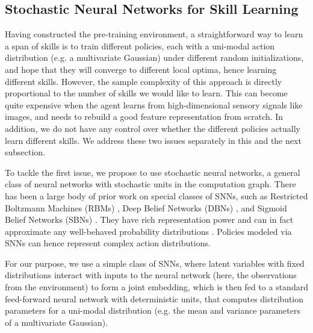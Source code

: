 \documentclass{article} %
\begin{document}
\subsection{Stochastic Neural Networks for Skill Learning}
\label{section:method:snn}

Having constructed the pre-training environment, a straightforward way to learn a span of skills is to train different policies, each with a uni-modal action distribution (e.g. a multivariate Gaussian) under different random initializations, and hope that they will converge to different local optima, hence learning different skills. However, the sample complexity of this approach is directly proportional to the number of skills we would like to learn. This can become quite expensive when the agent learns from high-dimensional sensory signals like images, and needs to rebuild a good feature representation from scratch. In addition, we do not have any control over whether the different policies actually learn different skills. We address these two issues separately in this and the next subsection.%

To tackle the first issue, we propose to use stochastic neural networks, a general class of neural networks with stochastic units in the computation graph. There has been a large body of prior work on special classes of SNNs, such as Restricted Boltzmann Machines (RBMs) \citep{smolensky1986information, hinton2002training}, Deep Belief Networks (DBNs) \citep{hinton2006fast}, and Sigmoid Belief Networks (SBNs) \citep{neal1990learning, Tang2014_FSNN}. They have rich representation power and can in fact approximate any well-behaved probability distributions \citep{le2008representational, cho2013gaussian}. Policies modeled via SNNs can hence represent complex action distributions.

For our purpose, we use a simple class of SNNs, where latent variables with fixed distributions interact with inputs to the neural network (here, the observations from the environment) to form a joint embedding, which is then fed to a standard feed-forward neural network with deterministic units, that computes distribution parameters for a uni-modal distribution (e.g. the mean and variance parameters of a multivariate Gaussian). 
\end{document}
